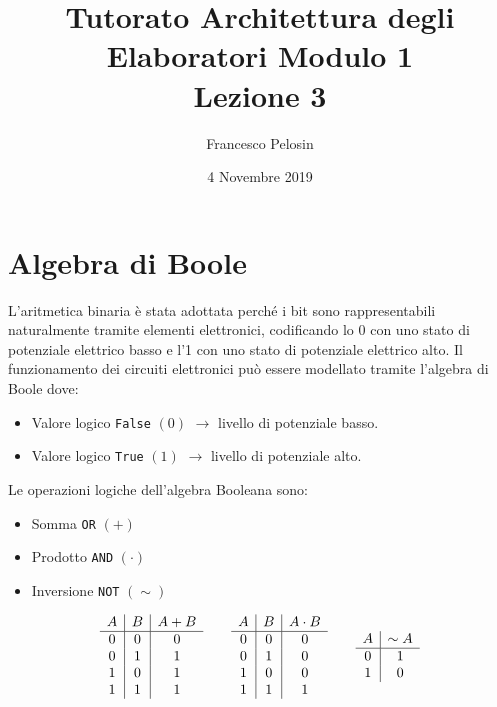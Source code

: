 \documentclass[tikz, border=2mm]{article}
\title{Tutorato Architettura degli Elaboratori Modulo 1 \\ Lezione 3}
\author{Francesco Pelosin}
\date{4 Novembre 2019}
\begin{document}
\maketitle

\section{Algebra di Boole}

L’aritmetica binaria \`e stata adottata perché i bit sono rappresentabili naturalmente tramite elementi elettronici, codificando lo 0 con uno stato di potenziale elettrico basso e l'1 con uno stato di potenziale elettrico alto.
Il funzionamento dei circuiti elettronici pu\`o essere modellato tramite l’algebra di Boole dove:

\begin{itemize}
    \item Valore logico \texttt{False} $(0)$ $\rightarrow$ livello di potenziale basso.
    \item Valore logico \texttt{True} $(1)$ $\rightarrow$ livello di potenziale alto.
\end{itemize}

\noindent Le operazioni logiche dell'algebra Booleana sono: 
\begin{itemize}
    \item Somma \texttt{OR} $(+)$
    \item Prodotto \texttt{AND} $(\cdot)$
    \item Inversione \texttt{NOT} $(\sim)$
\end{itemize}

\begin{equation*}
    \begin{array}{c c c c c}
    
        \begin{array}{c|c|c}
        A & B & A+B\\
        \hline
        0 & 0 & 0\\
        0 & 1 & 1\\
        1 & 0 & 1\\
        1 & 1 & 1\\
        \end{array}
        &      &
        
        \begin{array}{c|c|c}
        A & B & A\cdot B\\
        \hline
        0 & 0 & 0\\
        0 & 1 & 0\\
        1 & 0 & 0\\
        1 & 1 & 1\\
        \end{array}
        &      &
        
        \begin{array}{c|c}
        A & \sim A\\
        \hline
        0 & 1\\
        1 & 0\\
        \end{array}

    \end{array}
\end{equation*}
\end{document}
